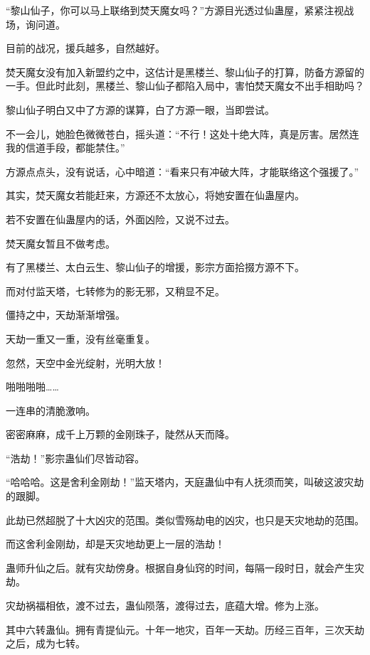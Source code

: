 
\begin{this_body}

“黎山仙子，你可以马上联络到焚天魔女吗？”方源目光透过仙蛊屋，紧紧注视战场，询问道。

目前的战况，援兵越多，自然越好。

焚天魔女没有加入新盟约之中，这估计是黑楼兰、黎山仙子的打算，防备方源留的一手。但此时此刻，黑楼兰、黎山仙子都陷入局中，害怕焚天魔女不出手相助吗？

黎山仙子明白又中了方源的谋算，白了方源一眼，当即尝试。

不一会儿，她脸色微微苍白，摇头道：“不行！这处十绝大阵，真是厉害。居然连我的信道手段，都能禁住。”

方源点点头，没有说话，心中暗道：“看来只有冲破大阵，才能联络这个强援了。”

其实，焚天魔女若能赶来，方源还不太放心，将她安置在仙蛊屋内。

若不安置在仙蛊屋内的话，外面凶险，又说不过去。

焚天魔女暂且不做考虑。

有了黑楼兰、太白云生、黎山仙子的增援，影宗方面拾掇方源不下。

而对付监天塔，七转修为的影无邪，又稍显不足。

僵持之中，天劫渐渐增强。

天劫一重又一重，没有丝毫重复。

忽然，天空中金光绽射，光明大放！

啪啪啪啪……

一连串的清脆激响。

密密麻麻，成千上万颗的金刚珠子，陡然从天而降。

“浩劫！”影宗蛊仙们尽皆动容。

“哈哈哈。这是舍利金刚劫！”监天塔内，天庭蛊仙中有人抚须而笑，叫破这波灾劫的跟脚。

此劫已然超脱了十大凶灾的范围。类似雪殇劫电的凶灾，也只是天灾地劫的范围。

而这舍利金刚劫，却是天灾地劫更上一层的浩劫！

蛊师升仙之后。就有灾劫傍身。根据自身仙窍的时间，每隔一段时日，就会产生灾劫。

灾劫祸福相依，渡不过去，蛊仙陨落，渡得过去，底蕴大增。修为上涨。

其中六转蛊仙。拥有青提仙元。十年一地灾，百年一天劫。历经三百年，三次天劫之后，成为七转。


\end{this_body}
